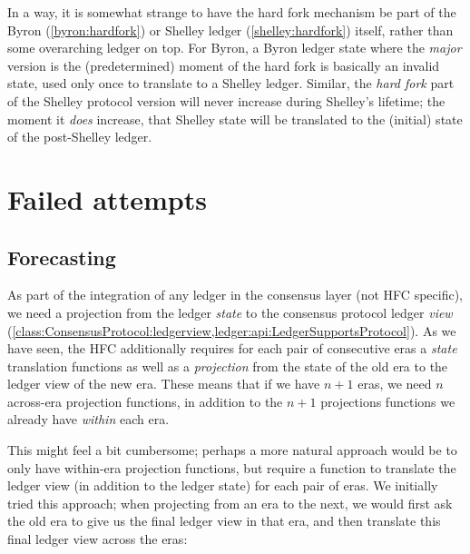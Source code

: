 In a way, it is somewhat strange to have the hard fork mechanism be part of the
Byron (\cref{byron:hardfork}) or Shelley ledger (\cref{shelley:hardfork})
itself, rather than some overarching ledger on top. For Byron, a Byron ledger
state where the \emph{major} version is the (predetermined) moment of the hard
fork is basically an invalid state, used only once to translate to a Shelley
ledger. Similar, the \emph{hard fork} part of the Shelley protocol version will
never increase during Shelley's lifetime; the moment it \emph{does} increase,
that Shelley state will be translated to the (initial) state of the post-Shelley
ledger.

\section{Failed attempts}

\subsection{Forecasting}

As part of the integration of any ledger in the consensus layer (not HFC
specific), we need a projection from the ledger \emph{state} to the consensus
protocol ledger \emph{view}
(\cref{class:ConsensusProtocol:ledgerview,ledger:api:LedgerSupportsProtocol}).
As we have seen,
the HFC additionally requires for each pair of consecutive eras a  \emph{state}
translation functions as well as a \emph{projection} from the state of the old
era to the ledger view of the new era. These means that if we have $n + 1$ eras,
we need $n$ across-era projection functions, in addition to the $n + 1$
projections functions we already have \emph{within} each era.

This might feel a bit cumbersome; perhaps a more natural approach would be to
only have within-era projection functions, but require a function to translate
the ledger view (in addition to the ledger state) for each pair of eras.
We initially tried this approach; when projecting from an era to the next,
we would first ask the old era to give us the final ledger view in that era,
and then translate this final ledger view across the eras:

